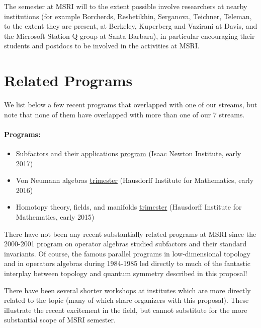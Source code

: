 \documentclass[12pt]{article}
\begin{document}
The semester at MSRI will to the extent possible involve researchers at nearby institutions (for example Borcherds, Reshetikhin, Serganova, Teichner, Teleman, to the extent they are present, at Berkeley, Kuperberg and Vazirani at Davis, and the Microsoft Station Q group at Santa Barbara), in particular encouraging their students and postdocs to be involved in the activities at MSRI.


\section{Related Programs}

We list below a few recent programs that overlapped with one of our streams, but note that none of them have overlapped with more than one of our 7 streams.

\paragraph{Programs:}
\begin{itemize}
  \setlength{\itemsep}{1pt}
  \setlength{\parskip}{0pt}
  \setlength{\parsep}{0pt}
\item Subfactors and their applications \href{https://www.newton.ac.uk/event/oas}{program} (Isaac Newton Institute, early 2017)
\item Von Neumann algebras \href{https://www.him.uni-bonn.de/programs/future-programs/future-trimester-programs/von-neumann-algebras-2016/description/}{trimester} (Hausdorff Institute for Mathematics, early 2016)
\item Homotopy theory, fields, and manifolds \href{https://www.him.uni-bonn.de/programs/past-programs/past-trimester-programs/homotopy-theory-2015/description/}{trimester} (Hausdorff Institute for Mathematics, early 2015)
\end{itemize}

There have not been any recent substantially related programs at MSRI since the 2000-2001 program on operator algebras studied subfactors and their standard invariants. Of course, the famous parallel programs in low-dimensional topology and in operators algebras during 1984-1985 led directly to much of the fantastic interplay between topology and quantum symmetry described in this proposal!

There have been several shorter workshops at institutes which are more directly related to the topic (many of which share organizers with this proposal).  These illustrate the recent excitement in the field, but cannot substitute for the more substantial scope of MSRI semester.
\end{document}
